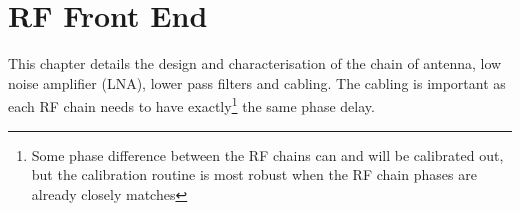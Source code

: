 \chapter{RF Front End}
\label{ch:rf-front-end}
\graphicspath{{./img/rf-front-end/}}

This chapter details the design and characterisation of the chain of antenna, low noise amplifier (LNA), lower pass filters and cabling. The cabling is important as each RF chain needs to have exactly\footnote{Some phase difference between the RF chains can and will be calibrated out, but the calibration routine is most robust when the RF chain phases are already closely matches} the same phase delay.







